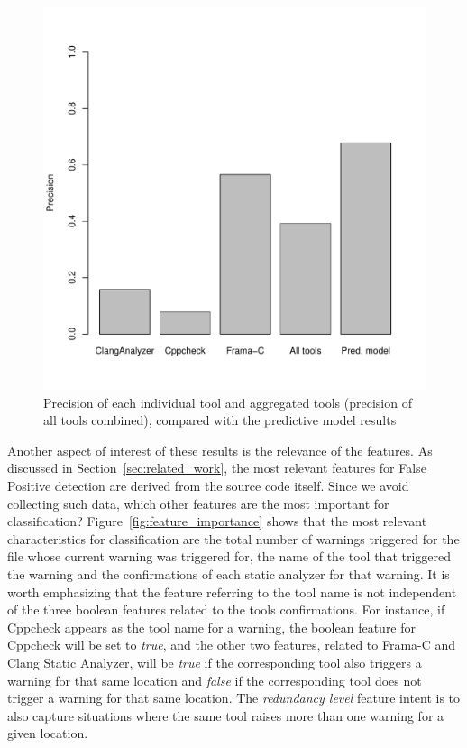 \begin{figure}
\centering
\includegraphics[width=.75\textwidth]{figures/precisions.pdf}
  \caption{Precision of each individual tool and aggregated tools (precision of all tools combined), compared with the predictive model results}\label{fig:precisions}
\end{figure}

Another aspect of interest of these results is the relevance of the features.
As discussed in Section~\ref{sec:related_work}, the most relevant features for
False Positive detection are derived from the source code itself. Since we
avoid collecting such data, which other features are the most important for
classification?  Figure~\ref{fig:feature_importance} shows that the most
relevant characteristics for classification are the total number of warnings
triggered for the file whose current warning was triggered for, the name of the
tool that triggered the warning and the confirmations of each static analyzer
for that warning. It is worth emphasizing that the feature referring to the
tool name is not independent of the three boolean features related to the tools
confirmations. For instance, if Cppcheck appears as the tool name for a warning,
the boolean feature for Cppcheck will be set to \emph{true}, and the other two
features, related to Frama-C and Clang Static Analyzer, will be \emph{true} if
the corresponding tool also triggers a warning for that same location and
\emph{false} if the corresponding tool does not trigger a warning for that same
location. The \emph{redundancy level} feature intent is to also capture
situations where the same tool raises more than one warning for a given
location.

